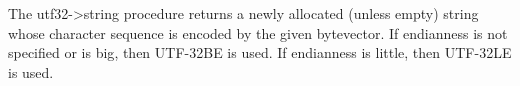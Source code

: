 \begin{entry}{%
}

  The {\cf utf32->string}
procedure returns a newly allocated (unless empty) string whose
character sequence is encoded by the given bytevector.
If endianness is not specified or is {\cf big},
then UTF-32BE is used.  If endianness is {\cf little}, then UTF-32LE
is used.
\end{entry}

